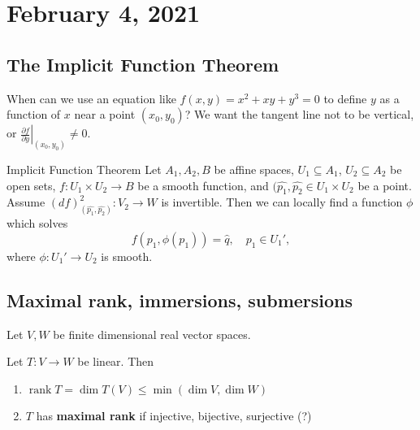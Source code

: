 \section{February 4, 2021}
\subsection{The Implicit Function Theorem}
When can we use an equation  like $f(x,y)= x^2+xy+y^3=0$ to define $y$ as a function of $x$ near a point $(x_0,y_0)$? We want the tangent line not to be vertical, or $\left. \frac{\partial f}{\partial y} \right| _{(x_0,y_0)}\neq 0$.
    \begin{namedthm}{Implicit Function Theorem}
        Let $A_1,A_2,B$ be affine spaces, $U_1 \subseteq A_1$, $U_2\subseteq A_2$ be open sets, $f \colon U_1\times U_2 \to B$ be a smooth function, and $(\hat{p_1}, \hat{p_2}\in  U_1 \times U_2$ be a point. Assume $(df)^2 _{(\hat{p_1}, \hat{p_2})} \colon V_2 \to W$ is invertible. Then we can locally find a function $\phi$ which solves \[
            f(p_1, \phi(p_1))=\hat{q}, \quad p_1 \in U_1',
        \] where $\phi \colon U_1' \to U_2$ is smooth.
\end{namedthm}
\subsection{Maximal rank, immersions, submersions}
Let $V, W$ be finite dimensional real vector spaces. 
\begin{definition}[]
    Let $T \colon V \to W$ be linear. Then
    \begin{enumerate}[label=(\roman*)]
        \item $\operatorname{rank}T= \operatorname{dim}T(V) \leq \min (\dim V, \dim W)$
        \item $T$ has \textbf{maximal rank} if injective, bijective, surjective (?)
    \end{enumerate}
\end{definition}

